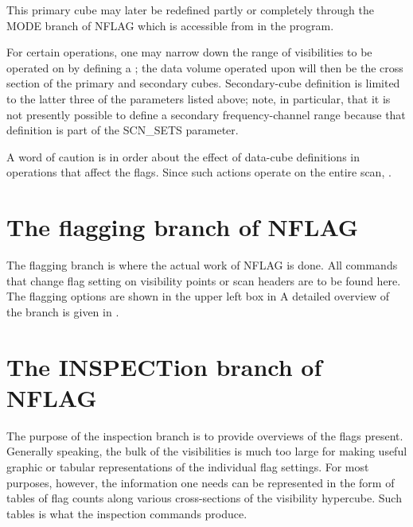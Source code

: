 \noindent This primary cube may later be redefined partly or completely through
the MODE branch of NFLAG which is accessible from 
in the program.

	For certain operations, one may narrow down the range of visibilities
to be operated on by defining a ; the data volume
operated upon will then be the cross section of the primary and secondary
cubes. Secondary-cube definition is limited to the latter three of the
parameters listed above; note, in particular, that it is not presently possible
to define a secondary frequency-channel range because that definition is part
of the SCN\_SETS parameter.

	A word of caution is in order about the effect of data-cube definitions
in operations that affect the  flags.
Since such actions operate on the entire scan, .


\section{ The flagging branch of NFLAG}
\label{.flagging.branch}





	The flagging branch is where the actual work of NFLAG is done. All
commands that change flag setting on visibility points or scan headers are to
be found here. The flagging options are shown in the upper left box in
 A detailed overview of the branch is given in
.


\section{ The INSPECTion branch of NFLAG}
\label{.inspection.branch}



	The purpose of the inspection branch is to provide overviews of the
flags present. Generally speaking, the bulk of the visibilities is much too
large for making useful graphic or tabular representations of the individual
flag settings. For most purposes, however, the information one needs can be
represented in the form of tables of flag counts along various cross-sections
of the visibility hypercube. Such tables is what the inspection commands
produce.

